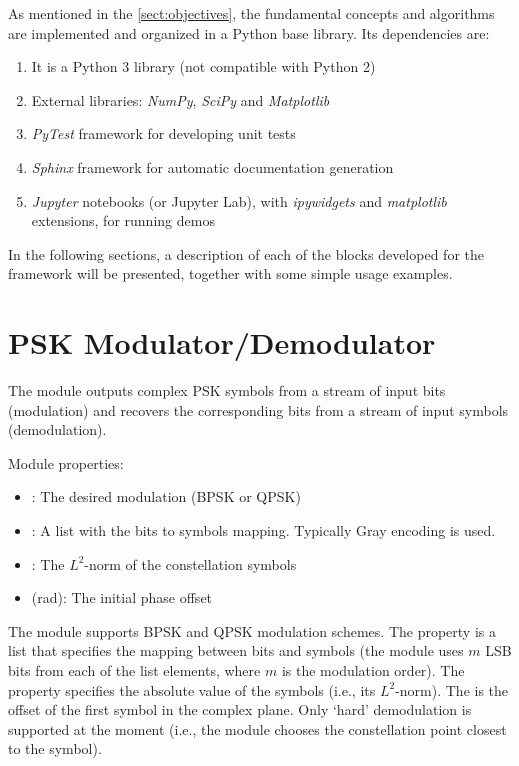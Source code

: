As mentioned in the \autoref{sect:objectives}, the fundamental concepts and algorithms are implemented and organized in a Python base library. Its dependencies are:
\begin{enumerate}
  \item It is a Python 3 library (not compatible with Python 2)
  \item External libraries: \emph{NumPy}, \emph{SciPy} and \emph{Matplotlib}
  \item \emph{PyTest} framework for developing unit tests
  \item \emph{Sphinx} framework for automatic documentation generation
  \item \emph{Jupyter} notebooks (or Jupyter Lab), with \emph{ipywidgets} and \emph{matplotlib} extensions, for running demos
\end{enumerate}

In the following sections, a description of each of the blocks developed for the framework will be presented, together with some simple usage examples.

\section{PSK Modulator/Demodulator}
The  module outputs complex PSK symbols from a stream of input bits (modulation) and recovers the corresponding bits from a stream of input symbols (demodulation).

\noindent Module properties:
\begin{itemize}
  \item {}: The desired modulation (BPSK or QPSK)
  \item {}: A list with the bits to symbols mapping. Typically Gray encoding is used.
  \item {}: The $L^2$-norm of the constellation symbols
  \item {} (rad): The initial phase offset
\end{itemize}

The module supports BPSK and QPSK modulation schemes. The  property is a list that specifies the mapping between bits and symbols (the module uses $m$ LSB bits from each of the list elements, where $m$ is the modulation order). The  property specifies the absolute value of the symbols (i.e., its $L^2$-norm). The  is the offset of the first symbol in the complex plane. Only `hard' demodulation is supported at the moment (i.e., the module chooses the constellation point closest to the symbol).

